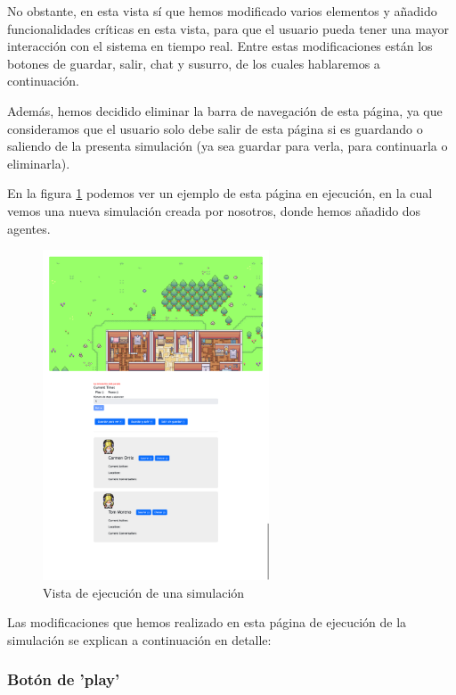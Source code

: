 No obstante, en esta vista sí que hemos modificado varios elementos y añadido funcionalidades críticas en esta vista, para que el usuario pueda tener una mayor interacción con el sistema en tiempo real. Entre estas modificaciones están los botones de guardar, salir, chat y susurro, de los cuales hablaremos a continuación.

Además, hemos decidido eliminar la barra de navegación de esta página, ya que consideramos que el usuario solo debe salir de esta página si es guardando o saliendo de la presenta simulación (ya sea guardar para verla, para continuarla o eliminarla).

En la figura \ref{fig:vistaEjecSim} podemos ver un ejemplo de esta página en ejecución, en la cual vemos una nueva simulación creada por nosotros, donde hemos añadido dos agentes.

\begin{figure}[H]
	\centering
	\includegraphics[width = 0.6\textwidth]{Imagenes/Vectorial/ejecucionSimu.png}
	\caption{Vista de ejecución de una simulación}
	\label{fig:vistaEjecSim}
\end{figure}

Las modificaciones que hemos realizado en esta página de ejecución de la simulación se explican a continuación en detalle:

\subsubsection{Botón de 'play'}

